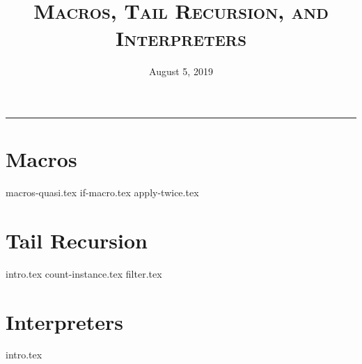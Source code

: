 \documentclass{exam}
\title{\textsc{Macros, Tail Recursion, and Interpreters}}
\date{August 5, 2019}
\begin{document}
\maketitle
\rule{\textwidth}{0.15em}
\fontsize{12}{15}\selectfont





\section{Macros}
\begin{questions}
{macros-quasi.tex}
{if-macro.tex}
{apply-twice.tex}
\end{questions}

\section{Tail Recursion}
\begin{questions}
{intro.tex}
{count-instance.tex}
{filter.tex}
\end{questions}

\section{Interpreters}
\begin{questions}
{intro.tex}
\end{questions}

\end{document}
